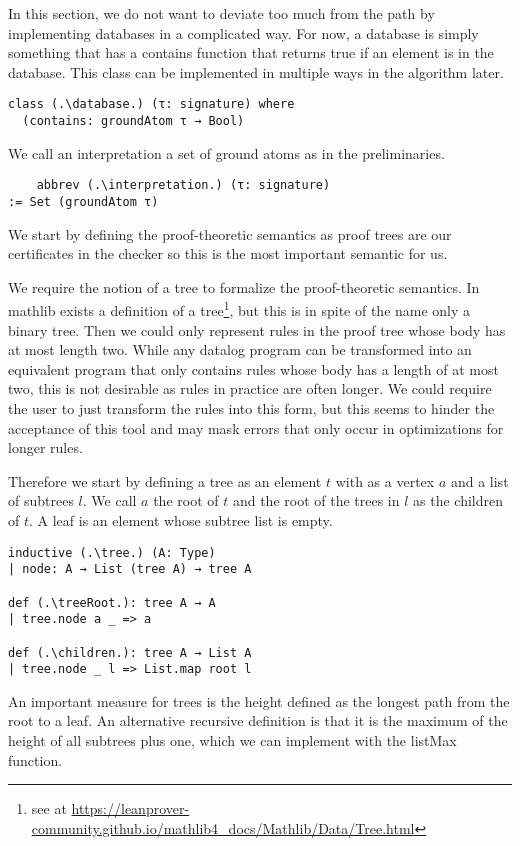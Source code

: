 In this section, we do not want to deviate too much from the path by implementing databases in a complicated way. For now, a database is simply something that has a contains function that returns true if an element is in the database. This class can be implemented in multiple ways in the algorithm later.

\begin{lstlisting}
class (.\database.) (τ: signature) where
  (contains: groundAtom τ → Bool)
\end{lstlisting}

We call an interpretation a set of ground atoms as in the preliminaries.
\begin{lstlisting}
    abbrev (.\interpretation.) (τ: signature)
:= Set (groundAtom τ)
\end{lstlisting}

We start by defining the proof-theoretic semantics as proof trees are our certificates in the checker so this is the most important semantic for us.

We require the notion of a tree to formalize the proof-theoretic semantics. In mathlib exists a definition of a tree\footnote{see at \protect\url{https://leanprover-community.github.io/mathlib4_docs/Mathlib/Data/Tree.html}}, but this is in spite of the name only a binary tree. Then we could only represent rules in the proof tree whose body has at most length two. While any datalog program can be transformed into an equivalent program that only contains rules whose body has a length of at most two, this is not desirable as rules in practice are often longer. We could require the user to just transform the rules into this form, but this seems to hinder the acceptance of this tool and may mask errors that only occur in optimizations for longer rules.

Therefore we start by defining a tree as an element $t$ with as a vertex $a$ and a list of subtrees $l$. We call $a$ the root of $t$ and the root of the trees in $l$ as the children of $t$. A leaf is an element whose subtree list is empty.

\begin{lstlisting}
inductive (.\tree.) (A: Type)
| node: A → List (tree A) → tree A

def (.\treeRoot.): tree A → A
| tree.node a _ => a

def (.\children.): tree A → List A
| tree.node _ l => List.map root l
\end{lstlisting}

An important measure for trees is the height defined as the longest path from the root to a leaf. An alternative recursive definition is that it is the maximum of the height of all subtrees plus one, which we can implement with the listMax function.

